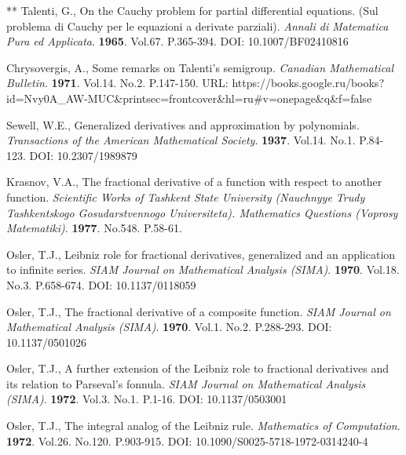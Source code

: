 \documentclass[12pt]{article}
\begin{document}
\begin{thebibliography}{**}
 Talenti, G., 
On the Cauchy problem for partial differential equations.
(Sul problema di Cauchy per le equazioni a derivate parziali).
\textit{Annali di Matematica Pura ed Applicata}.
\textbf{1965}. Vol.67. P.365-394. 
DOI: 10.1007/BF02410816

 Chrysovergis, A., 
Some remarks on Talenti's semigroup. 
\textit{Canadian Mathematical Bulletin}. 
\textbf{1971}. Vol.14. No.2. P.147-150.	
URL: https://books.google.ru/books?id=Nvy0A\_AW-MUC\&printsec=frontcover\&hl=ru\#v=onepage\&q\&f=false

 Sewell, W.E., 
Generalized derivatives and approximation by polynomials. 
\textit{Transactions of the American Mathematical Society}. 
\textbf{1937}. Vol.14. No.1. P.84-123.	
DOI: 10.2307/1989879

 Krasnov, V.A., 
The fractional derivative of a function with respect to another function. 
\textit{Scientific Works of Tashkent State University
(Nauchnyye Trudy Tashkentskogo Gosudarstvennogo Universiteta).
Mathematics Questions (Voprosy Matematiki)}.
\textbf{1977}. No.548. P.58-61.

 Osler, T.J., 
Leibniz role for fractional derivatives, generalized and an application to infinite series. 
\textit{SIAM Journal on Mathematical Analysis (SIMA)}. 
\textbf{1970}. Vol.18. No.3. P.658-674. 
DOI: 10.1137/0118059

 Osler, T.J., 
The fractional derivative of a composite function. 
\textit{SIAM Journal on Mathematical Analysis (SIMA)}. 
\textbf{1970}. Vol.1. No.2. P.288-293. 
DOI: 10.1137/0501026

 Osler, T.J., 
A further extension of the Leibniz role to fractional derivatives and its relation to Parseval's fonnula. 
\textit{SIAM Journal on Mathematical Analysis (SIMA)}. 
\textbf{1972}. Vol.3. No.1. P.1-16. 
DOI: 10.1137/0503001 

 Osler, T.J., 
The integral analog of the Leibniz rule. 
\textit{Mathematics of Computation}. 
\textbf{1972}. Vol.26. No.120. P.903-915. 
DOI: 10.1090/S0025-5718-1972-0314240-4




\end{thebibliography}
\end{document}
